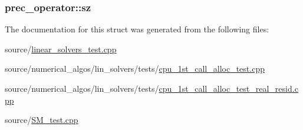 \hypertarget{structprec__operator_ac24790c11be0bdc90953e351804950cf}{
\subsubsection[{sz}]{ prec\-\_\-operator\-::sz}}\label{structprec__operator_ac24790c11be0bdc90953e351804950cf}


The documentation for this struct was generated from the following files\-:\begin{DoxyCompactItemize}
\item 
source/\hyperlink{linear__solvers__test_8cpp}{linear\-\_\-solvers\-\_\-test.\-cpp}\item 
source/numerical\-\_\-algos/lin\-\_\-solvers/tests/\hyperlink{cpu__1st__call__alloc__test_8cpp}{cpu\-\_\-1st\-\_\-call\-\_\-alloc\-\_\-test.\-cpp}\item 
source/numerical\-\_\-algos/lin\-\_\-solvers/tests/\hyperlink{cpu__1st__call__alloc__test__real__resid_8cpp}{cpu\-\_\-1st\-\_\-call\-\_\-alloc\-\_\-test\-\_\-real\-\_\-resid.\-cpp}\item 
source/\hyperlink{SM__test_8cpp}{S\-M\-\_\-test.\-cpp}\end{DoxyCompactItemize}
